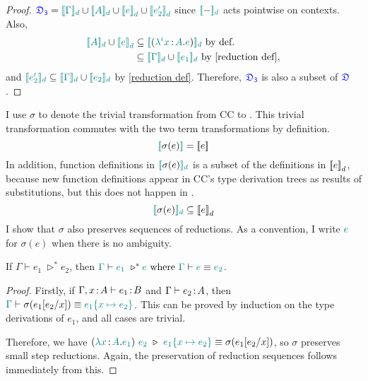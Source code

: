 \begin{lemma}
\begin{proof}
$\target{\fdef_3} = \hbracketd{\helper{\Gamma}} \cup \hbracketd{\helper{A}} \cup \helper{\bbracket{e}_d} \cup \helper{\bbracket{e_2'}_d}$ since $\hbracketd{-}$ acts pointwise on contexts. Also, 
\begin{align*}
	\hbracketd{\helper{A}} \cup \helper{\bbracket{e}_d} &\subseteq \hbracketd{(\helper{\lambda^i x} \goodcolon \helper{A} . \helper{e})} \text{ by def.}\\
	&\subseteq \hbracketd{\helper{\Gamma}} \cup \hbracketd{\helper{e_1}} \text{ by \eqref{reduction def}},
\end{align*}
and $\hbracketd{\helper{e_2'}} \subseteq \hbracketd{\helper{\Gamma}} \cup \hbracketd{\helper{e_2}}$ by \eqref{reduction def}. Therefore, $\target{\fdef_3}$ is also a subset of $\target{\fdef}$.
\end{proof}
\end{lemma}

I use $\sigma$ to denote the trivial transformation from CC to {\ccs}. This trivial transformation commutes with the two term transformations by definition.
\begin{equation}
\hbracket{\sigma(e)} = \bbracket{e}
\label{eq:commute}
\end{equation}
In addition, function definitions in $\hbracketd{\sigma(e)}$ is a subset of the definitions in $\bbracket{e}_d$, because new function definitions appear in CC's type derivation trees as results of substitutions, but this does not happen in {\ccs}. 
\begin{equation}
\hbracketd{\sigma(e)} \subseteq \bbracket{e}_d
\label{eq:commute_d}
\end{equation}
I show that $\sigma$ also preserves sequences of reductions. As a convention, I write $\helper{e}$ for $\sigma(e)$ when there is no ambiguity.
\begin{lemma}
\label{lem:sigma prev sequence}
If $\Gamma \vdash e_1\ \triangleright^* e_2$, then
$\helper{\Gamma} \vdash \helper{e_1}\ \triangleright^* \helper{e} \text{ where } \helper{\Gamma} \vdash \helper{e} \equiv \helper{e_2}$.
\begin{proof}
Firstly, if $\Gamma, x \goodcolon A \vdash e_1 \goodcolon B$ and $\Gamma \vdash e_2 \goodcolon A$, then
$\helper{\Gamma} \vdash \sigma(e_1\sub{e_2}{x}) \equiv \helper{e_1\hsub{e_2}{x}}$. This can be proved by induction on the type derivations of $e_1$, and all cases are trivial.

Therefore, we have $(\helper{\lambda x} \goodcolon \helper{A}. \helper{e_1})\ \helper{e_2}\ \triangleright\ 
\helper{e_1\hsub{e_2}{x}} \equiv \sigma(e_1\sub{e_2}{x})$, so $\sigma$ preserves small step reductions. Again, the preservation of reduction sequences follows immediately from this.
\end{proof}
\end{lemma}

